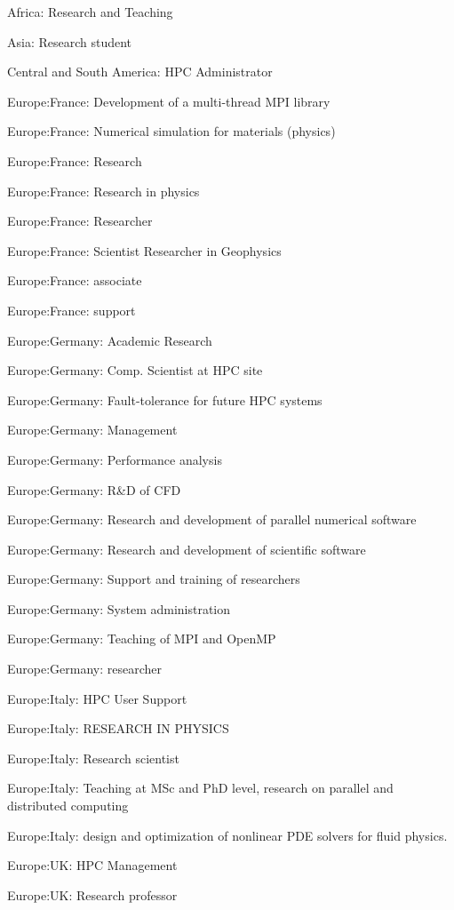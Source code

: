 \item Africa: Research and Teaching
\item Asia: Research student
\item Central and South America: HPC Administrator
\item Europe:France: Development of a  multi-thread MPI library
\item Europe:France: Numerical simulation for materials (physics)
\item Europe:France: Research
\item Europe:France: Research in physics
\item Europe:France: Researcher
\item Europe:France: Scientist Researcher in Geophysics
\item Europe:France: associate
\item Europe:France: support
\item Europe:Germany: Academic Research
\item Europe:Germany: Comp. Scientist at HPC site
\item Europe:Germany: Fault-tolerance for future HPC systems
\item Europe:Germany: Management
\item Europe:Germany: Performance analysis
\item Europe:Germany: R\&D of CFD
\item Europe:Germany: Research and development of parallel numerical software
\item Europe:Germany: Research and development of scientific software
\item Europe:Germany: Support and training of researchers
\item Europe:Germany: System administration
\item Europe:Germany: Teaching of MPI and OpenMP
\item Europe:Germany: researcher
\item Europe:Italy: HPC User Support
\item Europe:Italy: RESEARCH IN PHYSICS
\item Europe:Italy: Research scientist
\item Europe:Italy: Teaching at MSc and PhD level, research on parallel and distributed computing
\item Europe:Italy: design and optimization of nonlinear PDE solvers for fluid physics.
\item Europe:UK: HPC Management
\item Europe:UK: Research professor
